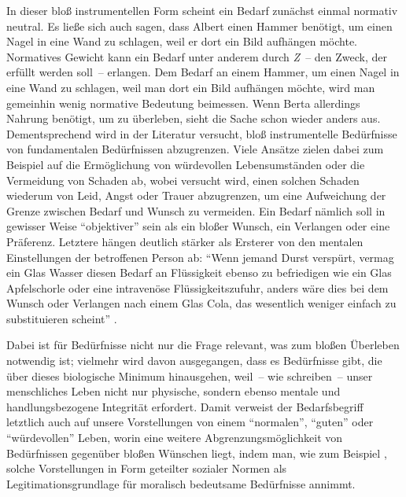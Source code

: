 \documentclass[justified,nobib,symmetric,twoside]{tufte-handout}
\begin{document}
In dieser bloß instrumentellen Form scheint ein Bedarf zunächst einmal normativ neutral.
Es ließe sich auch sagen, dass Albert einen Hammer benötigt, um einen Nagel in eine Wand zu schlagen, weil er dort ein Bild aufhängen möchte.
Normatives Gewicht kann ein Bedarf unter anderem durch \textit{Z}~-- den Zweck, der erfüllt werden soll~-- erlangen.
Dem Bedarf an einem Hammer, um einen Nagel in eine Wand zu schlagen, weil man dort ein Bild aufhängen möchte, wird man gemeinhin wenig normative Bedeutung beimessen.
Wenn Berta allerdings Nahrung benötigt, um zu überleben, sieht die Sache schon wieder anders aus.
Dementsprechend wird in der Literatur versucht, bloß instrumentelle Bedürfnisse von fundamentalen Bedürfnissen abzugrenzen.
Viele Ansätze zielen dabei zum Beispiel auf die Ermöglichung von würdevollen Lebensumständen oder die Vermeidung von Schaden ab, wobei versucht wird, einen solchen Schaden wiederum von Leid, Angst oder Trauer abzugrenzen, um eine Aufweichung der Grenze zwischen Bedarf und Wunsch zu vermeiden.
Ein Bedarf nämlich soll in gewisser Weise \enquote{objektiver} sein als ein bloßer Wunsch, ein Verlangen oder eine Präferenz.
Letztere hängen deutlich stärker als Ersterer von den mentalen Einstellungen der betroffenen Person ab: \enquote{Wenn jemand Durst verspürt, vermag ein Glas Wasser diesen Bedarf an Flüssigkeit ebenso zu befriedigen wie ein Glas Apfelschorle oder eine intravenöse Flüssigkeitszufuhr, anders wäre dies bei dem Wunsch oder Verlangen nach einem Glas Cola, das wesentlich weniger einfach zu substituieren scheint} \citep[S.~305]{bauer_gerechtigkeit_2019}.

Dabei ist für Bedürfnisse nicht nur die Frage relevant, was zum bloßen Überleben notwendig ist; vielmehr wird davon ausgegangen, dass es Bedürfnisse gibt, die über dieses biologische Minimum hinausgehen, weil~-- wie \citet[S.~32]{siebel_need_2020} schreiben~-- unser menschliches Leben nicht nur physische, sondern ebenso mentale und handlungsbezogene Integrität erfordert.
Damit verweist der Bedarfs\-begriff letztlich auch auf unsere Vorstellungen von einem \enquote{normalen}, \enquote{guten} oder \enquote{würdevollen} Leben, worin eine weitere Abgrenzungsmöglichkeit von Bedürfnissen gegenüber bloßen Wünschen liegt, indem man, wie zum Beispiel \citet{miller_principles_1999}, solche Vorstellungen in Form geteilter sozialer Normen als Legitimationsgrundlage für moralisch bedeutsame Bedürfnisse annimmt.


\end{document}
